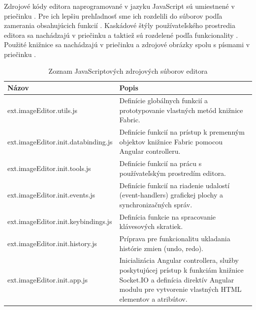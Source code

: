 Zdrojové kódy editora naprogramované v jazyku JavaScript sú umiestnené v priečinku . Pre ich lepšiu prehľadnosť sme ich rozdelili do súborov podľa zamerania obsahujúcich funkcií . Kaskádové štýly používateľského prostredia editora sa nachádzajú v priečinku  a taktiež sú rozdelené podľa funkcionality . Použité knižnice sa nachádzajú v priečinku  a zdrojové obrázky spolu s písmami v priečinku .

\begin{table}
	\begin{tabular}{ | m{6cm} | m{6.5cm} | } \hline
		\textbf{Názov} & \textbf{Popis} \\ \hline \hline
		
		ext.imageEditor.utils.js & Definície globálnych funkcií a prototypovanie vlastných metód knižnice Fabric. \\\hline
		ext.imageEditor.init.databinding.js & Definície funkcií na prístup k premenným objektov knižnice Fabric pomocou Angular controlleru. \\\hline
		ext.imageEditor.init.tools.js & Definície funkcií na prácu s používateľským prostredím editora. \\\hline
		ext.imageEditor.init.events.js & Definície funkcií na riadenie udalostí (event-handlers) grafickej plochy a synchronizačných správ. \\\hline
		ext.imageEditor.init.keybindings.js & Definícia funkcie na spracovanie klávesových skratiek. \\\hline
		ext.imageEditor.init.history.js & Príprava pre funkcionalitu ukladania histórie zmien (undo, redo). \\\hline
		ext.imageEditor.init.app.js & Inicializácia Angular controllera, služby poskytujúcej prístup k funkciám knižnice Socket.IO a definícia direktív Angular modulu pre vytvorenie vlastných HTML elementov a atribútov. \\\hline
		
		\hline
	\end{tabular}
	\caption{Zoznam JavaScriptových zdrojových súborov editora}
	\label{tab:editor-scripts-files}
\end{table}

